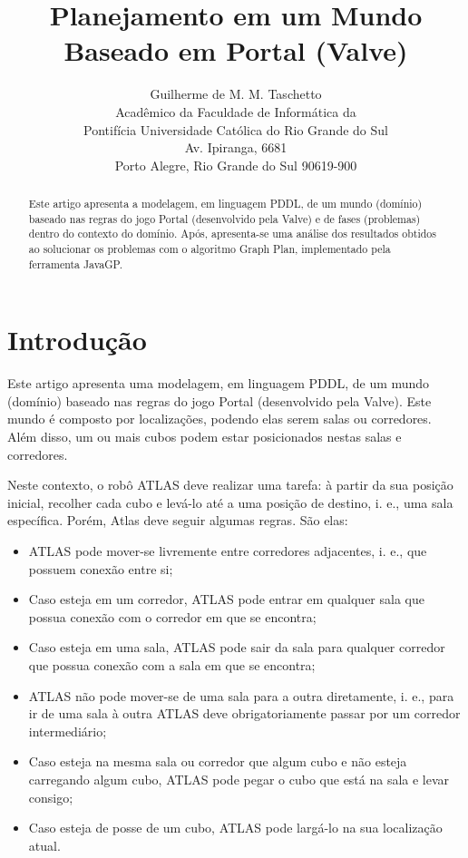 \documentclass[letterpaper]{article}
\begin{document}
\title{Planejamento em um Mundo\\Baseado em Portal (Valve)}
\author{Guilherme de M. M. Taschetto\\
Acadêmico da Faculdade de Informática da\\
Pontifícia Universidade Católica do Rio Grande do Sul\\
Av. Ipiranga, 6681\\
Porto Alegre, Rio Grande do Sul 90619-900\\
}

\maketitle
\begin{abstract}
Este artigo apresenta a modelagem, em linguagem PDDL, de um mundo (domínio) baseado nas regras do jogo Portal (desenvolvido pela Valve) e de fases (problemas) dentro do contexto do domínio. Após, apresenta-se uma análise dos resultados obtidos ao solucionar os problemas com o algoritmo Graph Plan, implementado pela ferramenta JavaGP.
\end{abstract}

\section{Introdução}

Este artigo apresenta uma modelagem, em linguagem PDDL, de um mundo (domínio) baseado nas regras do jogo Portal (desenvolvido pela Valve). Este mundo é composto por localizações, podendo elas serem salas ou corredores. Além disso, um ou mais cubos podem estar posicionados nestas salas e corredores.

Neste contexto, o robô ATLAS deve realizar uma tarefa: à partir da sua posição inicial, recolher cada cubo e levá-lo até a uma posição de destino, i. e., uma sala específica. Porém, Atlas deve seguir algumas regras. São elas:

\begin{itemize}
\item ATLAS pode mover-se livremente entre corredores adjacentes, i. e., que possuem conexão entre si;
\item Caso esteja em um corredor, ATLAS pode entrar em qualquer sala que possua conexão com o corredor em que se encontra;
\item Caso esteja em uma sala, ATLAS pode sair da sala para qualquer corredor que possua conexão com a sala em que se encontra;
\item ATLAS não pode mover-se de uma sala para a outra diretamente, i. e., para ir de uma sala à outra ATLAS deve obrigatoriamente passar por um corredor intermediário;
\item Caso esteja na mesma sala ou corredor que algum cubo e não esteja carregando algum cubo, ATLAS pode pegar o cubo que está na sala e levar consigo;
\item Caso esteja de posse de um cubo, ATLAS pode largá-lo na sua localização atual.
\end{itemize}
\end{document}
